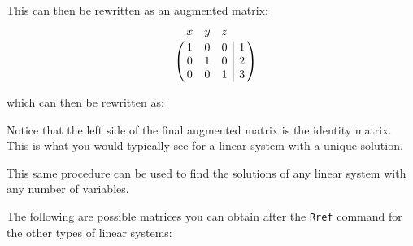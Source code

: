 \documentclass[a5paper,draft]{memoir}
\def\VR{\kern-\arraycolsep\strut\vrule &\kern-\arraycolsep}
\def\vr{\kern-\arraycolsep & \kern-\arraycolsep}
\def\code#1{\texttt{#1}}
\begin{document}
This can then be rewritten as an augmented matrix:
\begin{equation*}
\bordermatrix{  & x & y & z & \vr ~ \cr
			  ~ & 1 & 0 & 0 & \VR 1 \cr
			  ~ & 0 & 1 & 0 & \VR 2 \cr
			  ~ & 0 & 0 & 1 & \VR 3 }
\end{equation*}

which can then be rewritten as:
\begin{center}
\end{center}

Notice that the left side of the final augmented matrix is the identity matrix. This is what you would typically see for a linear system with a unique solution.

This same procedure can be used to find the solutions of any linear system with any number of variables.

The following are possible matrices you can obtain after the \code{Rref} command for the other types of linear systems:
\end{document}
